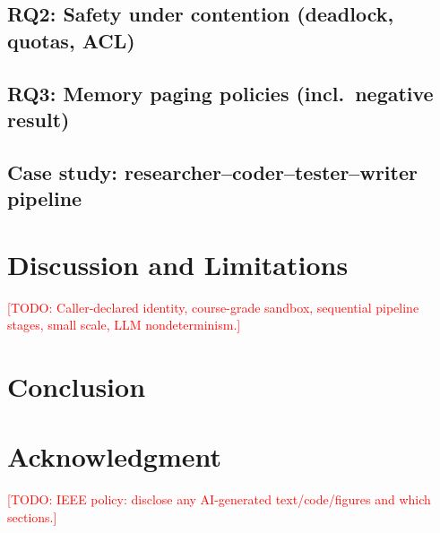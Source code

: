 \documentclass[conference,letterpaper]{IEEEtran}
\newcommand{\todo}[1]{\textcolor{red}{[TODO: #1]}}
\begin{document}
\subsection{RQ2: Safety under contention (deadlock, quotas, ACL)}
\subsection{RQ3: Memory paging policies (incl.\ negative result)}
\subsection{Case study: researcher--coder--tester--writer pipeline}

\section{Discussion and Limitations}\label{sec:disc}
\todo{Caller-declared identity, course-grade sandbox, sequential pipeline stages, small scale, LLM nondeterminism.}

\section{Conclusion}\label{sec:concl}

\section*{Acknowledgment}
\todo{IEEE policy: disclose any AI-generated text/code/figures and which sections.}



\end{document}
